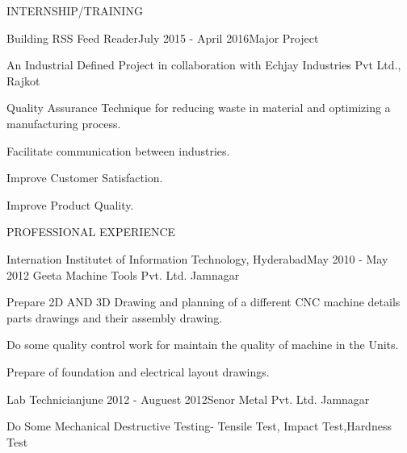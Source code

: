 \documentclass{resume} %
\begin{document}
\begin{rSection}{INTERNSHIP/TRAINING}

  \begin{rSubsection}
    {Building RSS Feed Reader}{July 2015 - April 2016}{Major Project}{}
  \item An Industrial Defined Project in collaboration with Echjay Industries Pvt Ltd., Rajkot
  \item Quality Assurance Technique for reducing waste in material and optimizing a
manufacturing process.
\item Facilitate communication between industries.
\item Improve Customer Satisfaction.
\item Improve Product Quality.
 
\end{rSubsection} 


\end{rSection} 



\begin{rSection}{PROFESSIONAL EXPERIENCE}

\begin{rSubsection}{Internation Institutet of Information Technology, Hyderabad}{May 2010 - May 2012} {Geeta Machine Tools Pvt. Ltd. Jamnagar} {} 
\item Prepare 2D AND 3D Drawing and planning of a different CNC machine details
parts drawings and their assembly drawing.
\item Do some quality control work for maintain the quality of machine in the Units.
\item Prepare of foundation and electrical layout drawings.
\end{rSubsection}



\begin{rSubsection}{Lab Technician}{june 2012 - Auguest 2012}{Senor Metal Pvt. Ltd. Jamnagar} {}
 \item Do Some Mechanical Destructive Testing- Tensile Test, Impact Test,Hardness Test
\end{rSubsection}
 
\end{rSection}
\end{document}
